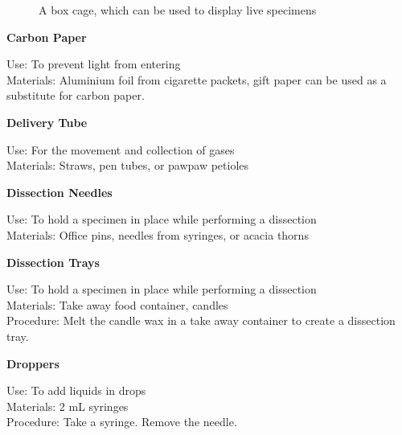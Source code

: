 \begin{figure}[h]
\begin{center}
\def\svgwidth{6cm}

\caption{A box cage, which can be used to display live specimens}
\label{fig:box-cage}
\end{center}
\end{figure}

\begin{flushleft}
\textbf{Carbon Paper}
\end{flushleft}
\vspace{-10pt}
Use: To prevent light from entering\\
Materials: Aluminium foil from cigarette packets, gift paper can be used as a substitute for carbon paper. \\

\begin{flushleft}
\textbf{Delivery Tube}
\end{flushleft}
\vspace{-10pt}
Use: For the movement and collection of gases\\
Materials: Straws, pen tubes, or pawpaw petioles\\

\begin{flushleft}
\textbf{Dissection Needles}
\end{flushleft}
\vspace{-10pt}
Use: To hold a specimen in place while performing a dissection\\
Materials: Office pins, needles from syringes, or acacia thorns\\

\begin{flushleft}
\textbf{Dissection Trays}
\end{flushleft}
\vspace{-10pt}
Use: To hold a specimen in place while performing a dissection\\
Materials: Take away food container, candles\\
Procedure: Melt the candle wax in a take away container to create a dissection tray.\\

\begin{flushleft}
\textbf{Droppers}
\end{flushleft}
\vspace{-10pt}
Use: To add liquids in drops\\
Materials: 2 mL syringes\\
Procedure: Take a syringe. Remove the needle. \\

